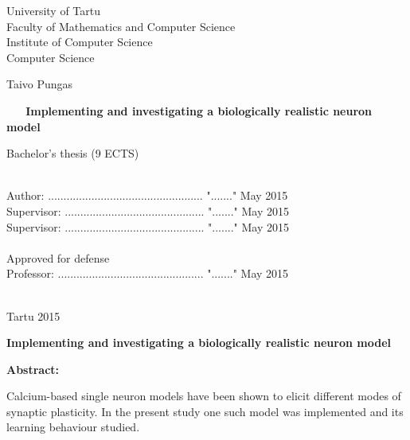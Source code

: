 \documentclass[a4paper,12pt]{report}
\theoremstyle{definition}
\newcommand{\thesistitle}{Implementing and investigating a biologically realistic neuron model} %
\begin{document}
\begin{center}
	{\Large
	University of Tartu\\
	Faculty of Mathematics and Computer Science\\
	Institute of Computer Science\\
	Computer Science\\}
	
	\vspace{2.5cm}
	
	{\LARGE Taivo Pungas}\\
	\vspace{0.5cm}
	\begin{spacing}{2}{\Huge\bf \ \ \ \thesistitle}\end{spacing}
	\vspace{0.5cm}
	{\LARGE Bachelor's thesis (9 ECTS)}
\end{center}
\vspace{3cm}
\hspace{7.2cm}{\Large Supervisors: Dr. Raul Vicente\\}
\vspace{-0.5cm}

\hspace{10.4cm}{\Large Dr. Jaan Aru \\}

\ \\
Author: .................................................. "......." May 2015\\
Supervisor: ............................................. "......." May 2015\\
Supervisor: ............................................. "......." May 2015\\
\ \\
Approved for defense\\
Professor: ............................................... "......." May 2015\\
\ \\
\begin{center}
	{\Large Tartu 2015}
\end{center}
\thispagestyle{empty}
\pagebreak




{\textbf
{\Large \thesistitle}}

\textbf{Abstract:}

Calcium-based single neuron models have been shown to elicit different modes of synaptic plasticity. In the present study one such model was implemented and its learning behaviour studied.
\end{document}
